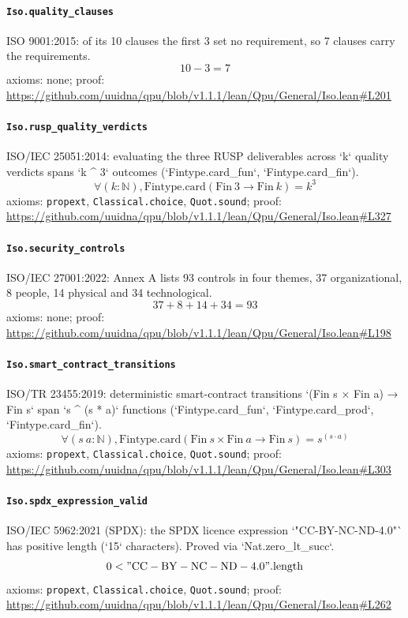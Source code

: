 \documentclass[11pt]{article}
\begin{document}
\paragraph{\texttt{Iso.quality\_clauses}}
ISO 9001:2015: of its 10 clauses the first 3 set no requirement, so 7 clauses carry the requirements.
\[ 10 - 3 = 7 \]
\noindent axioms: none; proof: \url{https://github.com/uuidna/qpu/blob/v1.1.1/lean/Qpu/General/Iso.lean\#L201}

\paragraph{\texttt{Iso.rusp\_quality\_verdicts}}
ISO/IEC 25051:2014: evaluating the three RUSP deliverables across `k` quality verdicts spans `k \^{} 3` outcomes (`Fintype.card\_fun`, `Fintype.card\_fin`).
\[ \forall (k : \mathbb{N}), \mathrm{Fintype.card} (\mathrm{Fin}\ 3 \to \mathrm{Fin}\ k) = k ^{3} \]
\noindent axioms: \texttt{propext}, \texttt{Classical.choice}, \texttt{Quot.sound}; proof: \url{https://github.com/uuidna/qpu/blob/v1.1.1/lean/Qpu/General/Iso.lean\#L327}

\paragraph{\texttt{Iso.security\_controls}}
ISO/IEC 27001:2022: Annex A lists 93 controls in four themes, 37 organizational, 8 people, 14 physical and 34 technological.
\[ 37 + 8 + 14 + 34 = 93 \]
\noindent axioms: none; proof: \url{https://github.com/uuidna/qpu/blob/v1.1.1/lean/Qpu/General/Iso.lean\#L198}

\paragraph{\texttt{Iso.smart\_contract\_transitions}}
ISO/TR 23455:2019: deterministic smart-contract transitions `(Fin s × Fin a) → Fin s` span `s \^{} (s * a)` functions (`Fintype.card\_fun`, `Fintype.card\_prod`, `Fintype.card\_fin`).
\[ \forall (s\ a : \mathbb{N}), \mathrm{Fintype.card} (\mathrm{Fin}\ s \times \mathrm{Fin}\ a \to \mathrm{Fin}\ s) = s ^{(s \cdot a)} \]
\noindent axioms: \texttt{propext}, \texttt{Classical.choice}, \texttt{Quot.sound}; proof: \url{https://github.com/uuidna/qpu/blob/v1.1.1/lean/Qpu/General/Iso.lean\#L303}

\paragraph{\texttt{Iso.spdx\_expression\_valid}}
ISO/IEC 5962:2021 (SPDX): the SPDX licence expression `"CC-BY-NC-ND-4.0"` has positive length (`15` characters). Proved via `Nat.zero\_lt\_succ`.
\[ 0 < "\mathrm{CC}-\mathrm{BY}-\mathrm{NC}-\mathrm{ND}-\mathrm{4.0}"\mathrm{.length} \]
\noindent axioms: \texttt{propext}, \texttt{Classical.choice}, \texttt{Quot.sound}; proof: \url{https://github.com/uuidna/qpu/blob/v1.1.1/lean/Qpu/General/Iso.lean\#L262}
\end{document}

